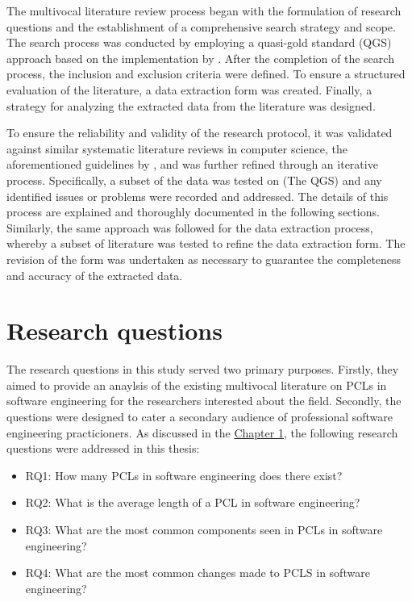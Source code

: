 The multivocal literature review process began with the formulation of research questions and the establishment of a comprehensive search strategy and scope. The search process was conducted by employing a quasi-gold standard (QGS) approach based on the implementation by \cite{qgs}. After the completion of the search process, the inclusion and exclusion criteria were defined. To ensure a structured evaluation of the literature, a data extraction form was created. Finally, a strategy for analyzing the extracted data from the literature was designed.

 To ensure the reliability and validity of the research protocol, it was validated against similar systematic literature reviews in computer science, the aforementioned guidelines by \cite{kitchenham2007}, and was further refined through an iterative process. Specifically, a subset of the data was tested on (The QGS) and any identified issues or problems were recorded and addressed. The details of this process are explained and thoroughly documented in the following sections. Similarly, the same approach was followed for the data extraction process, whereby a subset of literature was tested to refine the data extraction form. The revision of the form was undertaken as necessary to guarantee the completeness and accuracy of the extracted data.

\section{Research questions}
The research questions in this study served two primary purposes. Firstly, they aimed to provide an anaylsis of the existing multivocal literature on PCLs in software engineering for the researchers interested about the field. Secondly, the questions were designed to cater a secondary audience of professional software engineering practicioners. As discussed in the \hyperref[intro]{Chapter 1}, the following research questions were addressed in this thesis:

\begin{itemize}
	\item RQ1: How many PCLs in software engineering does there exist?
	\item RQ2: What is the average length of a PCL in software engineering?
	\item RQ3: What are the most common components seen in PCLs in software engineering?
	\item RQ4: What are the most common changes made to PCLS in software engineering?
\end{itemize}

